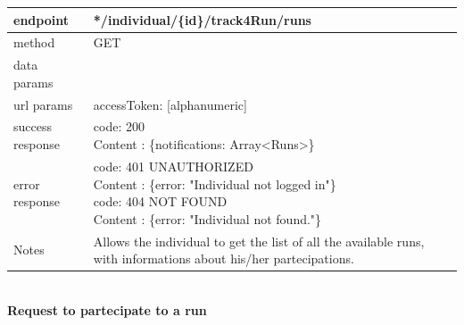 \begin{legal}
\begin{legal}
\begin{itemize}
								\begin{tabularx}{\linewidth}{| l | l |}
									\hline
									endpoint & */individual/\{id\}/track4Run/runs\\
									\hline
									method & GET \\
									\hline
									data params & \\
									\hline
									url params &
									\parbox{0.7\textwidth}{
										\bigskip
										accessToken: [alphanumeric]
										\bigskip
									} \\
									\hline
									success response &
									\parbox{0.7\textwidth}{
										\bigskip
										code: 200\\
										Content : \{notifications: Array<Runs>\}
										\bigskip
									} \\
									\hline
									error response &
									\parbox{0.7\textwidth}{
										\bigskip
										code: 401 UNAUTHORIZED \\
										Content : \{error: "Individual not logged in"\}\\
										code: 404 NOT FOUND \\
										Content : \{error: "Individual not found."\}
										\bigskip
									} \\
									\hline
									Notes & 
									\parbox{0.7\textwidth}{
										\bigskip Allows the individual to get the list of all the available runs, with informations about his/her partecipations.
									\bigskip}  \\
									\hline
								\end{tabularx}\\
								
								\textbf{Request to partecipate to a run} \\
			

\end{itemize}
\end{legal}
\end{legal}
